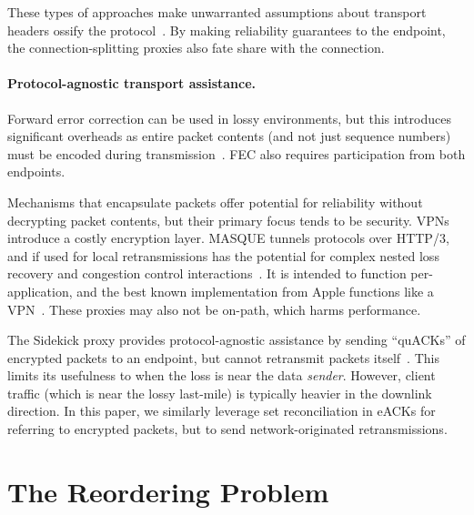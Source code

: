 These types of approaches make unwarranted assumptions about
transport headers ossify the protocol~\cite{papastergiou2017deossifying}.
By making reliability guarantees to the endpoint, the connection-splitting
proxies also fate share with the connection.

\paragraph{Protocol-agnostic transport assistance.}

Forward error correction can be used in lossy environments, but this
introduces significant overheads as entire packet contents (and not just
sequence numbers) must be encoded during transmission~\cite
{rfc9265}. FEC also requires participation from both endpoints.

Mechanisms that encapsulate packets offer potential for reliability without
decrypting packet contents, but their primary focus tends to be security. VPNs
introduce a costly encryption layer. MASQUE tunnels protocols over HTTP/3, and
if used for local retransmissions has the potential for complex nested loss
recovery and congestion control interactions~\cite
{rfc9298masque,schinazi-masque-proxy-05,kramer2021masquepep}. It is intended to
function per-application, and the best known implementation from Apple
functions like a VPN~\cite{icloud-private-relay}. These proxies may also not be
on-path, which harms performance.

The Sidekick proxy provides protocol-agnostic assistance by sending
``quACKs'' of encrypted packets to an endpoint, but cannot retransmit
packets itself~\cite{yuan2024sidekick}. This limits its usefulness
to when the loss is near the data \textit{sender}.
However, client traffic (which is near the lossy last-mile) is typically heavier
in the downlink direction. In this paper, we similarly leverage set
reconciliation in eACKs for referring to encrypted packets,
but to send network-originated retransmissions.

\section{The Reordering Problem}

